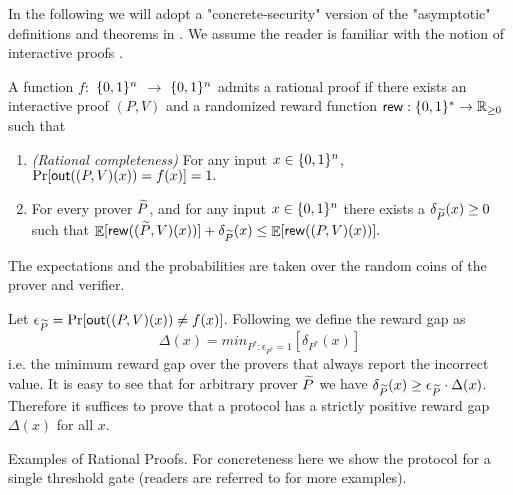 
In the following we will adopt a "concrete-security" version of the "asymptotic" definitions and theorems in \cite{am1,rosen}. We assume the reader is familiar with the notion of interactive proofs \cite{gmr}. 

\noindent
\begin{definition}
\label{def:RP-delta}
\label{def:RP}
A function $f:$ $\{0, 1\}^n$ $\to$ $\{0, 1\}^n$ admits a rational proof if there exists an interactive proof $(P,V)$ and a randomized reward function
$\mathsf{rew} : \{0, 1\}^{*} \to \mathbb{R}_{\geq 0}$ such that

\begin{enumerate}
\item \emph{(Rational completeness)} For any input $x \in 
\{0, 1\}^n$, $\Pr[\mathsf{out}((P,V)(x)) = f(x)] = 1.$

\item For every prover $\widetilde{P}$, and for any input $x \in 
\{0, 1\}^n$ there exists a $\delta_{\widetilde{P}}(x) \geq 0$ such that 
$ \mathop{\mathbb{E}}[\mathsf{rew}((\widetilde{P},V)(x))] + \delta_{\widetilde{P}}(x) \leq \mathop{\mathbb{E}}[\mathsf{rew}((P,V)(x))]. $
\end{enumerate}
The expectations and the probabilities are taken over the random coins of the prover and verifier.
\end{definition} 

\noindent
Let $\epsilon_{\widetilde{P}} = \Pr[\mathsf{out}((P,V)(x)) \neq f(x)]$. 
Following \cite{rosen} we define the {\sf reward gap} as 
\[ \Delta(x) = min_{P^* : \epsilon_{P^*}=1}[\delta_{P^*}(x)]  \]
i.e. the minimum reward gap over the provers that always report the incorrect value. 
It is easy to see that for arbitrary prover $\widetilde{P}$ we have $\delta_{\widetilde{P}}(x) \geq 
\epsilon_{\widetilde{P}} \cdot \Delta(x)$. Therefore it suffices to prove that a protocol has 
a strictly positive reward gap $\Delta(x)$ for all $x$. 

\smallskip
\noindent
{\sc Examples of Rational Proofs.} For concreteness here we show the protocol for a single threshold gate (readers are referred to \cite{am,am1,rosen} for more examples). 

